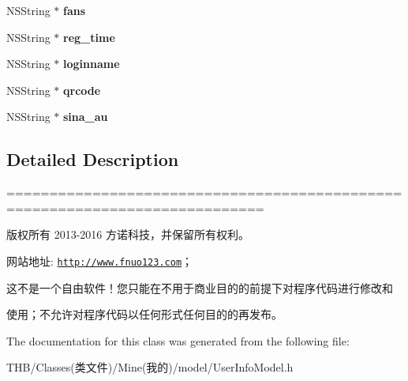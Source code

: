 \begin{DoxyCompactItemize}
\mbox{\label{interface_user_info_model_a881f80a82bbe475c8831bd5f12040d2b}} 
N\+S\+String $\ast$ {\bfseries fans}
\item 
\mbox{\label{interface_user_info_model_ae31e130c05549e6e59271d11b4539adf}} 
N\+S\+String $\ast$ {\bfseries reg\+\_\+time}
\item 
\mbox{\label{interface_user_info_model_a3e5848bb95113bdb285d5f916e29cc8a}} 
N\+S\+String $\ast$ {\bfseries loginname}
\item 
\mbox{\label{interface_user_info_model_a12d1003001d35d2764cd18bd49df284a}} 
N\+S\+String $\ast$ {\bfseries qrcode}
\item 
\mbox{\label{interface_user_info_model_a03f677c37c912bc9285b775496c695a4}} 
N\+S\+String $\ast$ {\bfseries sina\+\_\+au}
\end{DoxyCompactItemize}


\subsection{Detailed Description}
============================================================================

版权所有 2013-\/2016 方诺科技，并保留所有权利。

网站地址\+: \href{http://www.fnuo123.com}{\tt http\+://www.\+fnuo123.\+com}； 



这不是一个自由软件！您只能在不用于商业目的的前提下对程序代码进行修改和

使用；不允许对程序代码以任何形式任何目的的再发布。 

 

The documentation for this class was generated from the following file\+:\begin{DoxyCompactItemize}
\item 
T\+H\+B/\+Classes(类文件)/\+Mine(我的)/model/User\+Info\+Model.\+h\end{DoxyCompactItemize}
